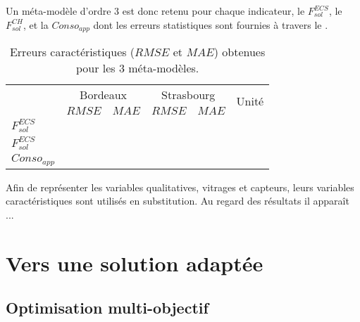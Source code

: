 Un méta-modèle d’ordre \num{3} est donc retenu pour chaque indicateur, le $F_{sol}^{ECS}$, le $F_{sol}^{CH}$,
et la $Conso_{app}$ dont les erreurs statistiques sont fournies à travers le .


\begin{table}
\centering
\caption{Erreurs caractéristiques ($RMSE$ et $MAE$) obtenues pour les \num{3} méta-modèles.
\label{tab:meta_retenus}}
\begin{tabular}{l c c c c r}
    \toprule
                    & \multicolumn{2}{c}{Bordeaux} & \multicolumn{2}{c}{Strasbourg} & \multirow{2}{*}{Unité} \\
                    \cmidrule(r){2-3}
                    \cmidrule(r){4-5}
                    & $RMSE$ & $MAE$               & $RMSE$ & $MAE$                 &                        \\
    \midrule
    $F_{sol}^{ECS}$ &  & & & & \\
    \addlinespace[\defaultaddspace]
    $F_{sol}^{ECS}$ &  & & & & \\
    \addlinespace[\defaultaddspace]
    $Conso_{app}$   &  & & & & \\
    \bottomrule
\end{tabular}
\end{table}

Afin de représenter les variables qualitatives, vitrages et capteurs, leurs variables
caractéristiques sont utilisés en substitution. Au regard des résultats il apparaît ...




\section{Vers une solution adaptée} %
\label{sec:vers_une_solution_adaptee}
\subsection{Optimisation multi-objectif} %
\label{sub:optimisation_multi_objectif}
~
